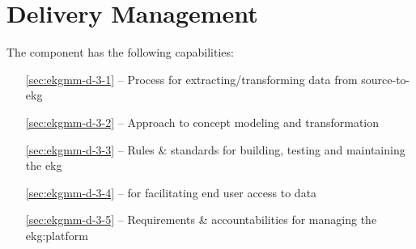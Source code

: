 \chapter{ Delivery Management}\label{ch:ekgmm-d-3}

The  component has the following capabilities:

\begin{itemize}[leftmargin=.5in]
  \item [\ref{sec:ekgmm-d-3-1}]  -- Process for extracting/transforming data from source-to-\gls{ekg}
  \item [\ref{sec:ekgmm-d-3-2}]  -- Approach to concept modeling and transformation
  \item [\ref{sec:ekgmm-d-3-3}]  -- Rules \& standards for building, testing and maintaining the \gls{ekg}
  \item [\ref{sec:ekgmm-d-3-4}]  --  for facilitating end user access to data
  \item [\ref{sec:ekgmm-d-3-5}]  -- Requirements \& accountabilities for managing the \gls{ekg:platform}
\end{itemize}







